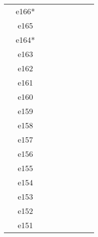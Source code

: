 \documentclass[10pt,letterpaper]{article}
\begin{document}
\begin{center}
\begin{tabular}{ |c|c|c|c|c|c|c|c|c| }
        & e166* &         &                  &            &         &          &                &            \\
        & e165 &         &                  &            &         &          &                &            \\
        & e164* &         &                  &            &         &          &                &            \\
        & e163 &         &                  &            &         &          &                &            \\
        & e162 &         &                  &            &         &          &                &            \\
        & e161 &         &                  &            &         &          &                &            \\
        & e160 &         &                  &            &         &          &                &            \\
        & e159 &         &                  &            &         &          &                &            \\
        & e158 &         &                  &            &         &          &                &            \\
        & e157 &         &                  &            &         &          &                &            \\
        & e156 &         &                  &            &         &          &                &            \\
        & e155 &         &                  &            &         &          &                &            \\
        & e154 &         &                  &            &         &          &                &            \\
        & e153 &         &                  &            &         &          &                &            \\
        & e152 &         &                  &            &         &          &                &            \\
        & e151 &         &                  &            &         &          &                &            \\
        \hline
        \end{tabular}
        \end{center}

    \clearpage
\end{document}
